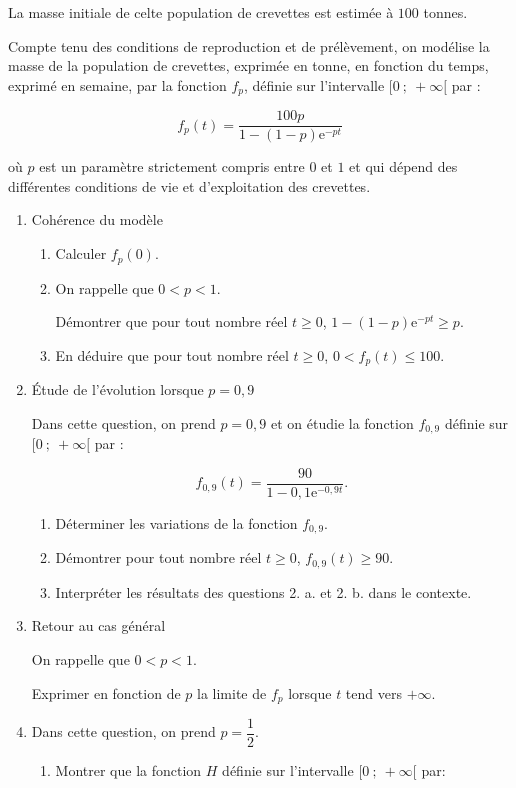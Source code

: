 \documentclass[10pt,a4paper]{article}
\begin{document}
La masse initiale de celte population de crevettes est estimée à $100$ tonnes.

Compte tenu des conditions de reproduction et de prélèvement, on modélise la masse de la
population de crevettes, exprimée en tonne, en fonction du temps, exprimé en semaine, par la fonction $f_p$, définie sur l'intervalle $[0~;~ +\infty[$ par :

\[f_p(t) = \dfrac{100p}{1 - (1 - p)\text{e}^{- pt}}\]

où $p$ est un paramètre strictement compris entre $0$ et $1$ et qui dépend des différentes conditions de vie et d'exploitation des crevettes.

\medskip

\begin{enumerate}
\item Cohérence du modèle
	\begin{enumerate}
		\item Calculer $f_p(0)$.
		\item On rappelle que $0 < p < 1$.
		
Démontrer que pour tout nombre réel $t \geqslant 0$,\: $1 - (1 - p)\text{e}^{- pt} \geqslant p$.
		\item En déduire que pour tout nombre réel $t \geqslant 0$,\: $0 < f_p(t) \leqslant  100$.
 	\end{enumerate}
\item  Étude de l'évolution lorsque $p = 0,9$
	
Dans cette question, on prend $p = 0,9$ et on étudie la fonction $f_{0,9}$ définie sur $[0~;~+\infty[$ par :
	
\[f_{0,9}(t) = \dfrac{90}{1 - 0,1 \text{e}^{- 0,9t}}.\]
	
	\begin{enumerate}
		\item Déterminer les variations de la fonction $f_{0,9}$.
		\item Démontrer pour tout nombre réel $t \geqslant 0$,\: $f_{0,9}(t) \geqslant 90$.
		\item Interpréter les résultats des questions 2. a. et 2. b. dans le contexte.
	\end{enumerate}
\item  Retour au cas général
	
On rappelle que $0 < p < 1$.
	
Exprimer en fonction de $p$ la limite de $f_p$ lorsque $t$ tend vers $+ \infty$.
\item  Dans cette question, on prend $p = \dfrac{1}{2}$.
	\begin{enumerate}
		\item Montrer que la fonction $H$ définie sur l'intervalle $[0~;~ +\infty[$ par:


\end{enumerate}
\end{enumerate}
\end{document}
